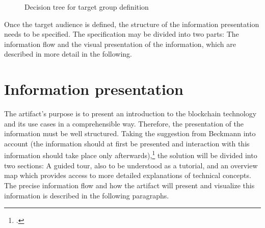 \begin{figure}
    \centering
    
    \caption{Decision tree for target group definition}
    \label{fig:TargetGroup}
\end{figure}

Once the target audience is defined, the structure of the information presentation needs to be specified. The specification may be divided into two parts: The information flow and the visual presentation of the information, which are described in more detail in the following.

\section{Information presentation} \label{sec:InformationPresentation}
The artifact's purpose is to present an introduction to the blockchain technology and its use cases in a comprehensible way. Therefore, the presentation of the information must be well structured. Taking the suggestion from Beckmann into account (the information should at first be presented and interaction with this information should take place only afterwards),\footcite[Cf.][P115]{RalphBeckmann_Interview} the solution will be divided into two sections: A guided tour, also to be understood as a tutorial, and an overview map which provides access to more detailed explanations of technical concepts. The precise information flow and how the artifact will present and visualize this information is described in the following paragraphs.

